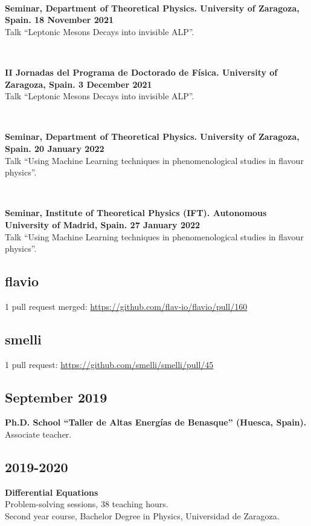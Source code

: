 \documentclass{cvf}
\begin{document}
~

\textbf{Seminar, Department of Theoretical Physics. University of Zaragoza, Spain. 18 November 2021}\\
Talk ``Leptonic Mesons Decays into invisible ALP''.

~

\textbf{II Jornadas del Programa de Doctorado de Física. University of Zaragoza, Spain. 3 December 2021}\\
Talk ``Leptonic Mesons Decays into invisible ALP''.

~

\textbf{Seminar, Department of Theoretical Physics. University of Zaragoza, Spain. 20 January 2022}\\
Talk ``Using Machine Learning techniques in phenomenological studies in flavour physics''.

~

\textbf{Seminar, Institute of Theoretical Physics (IFT). Autonomous University of Madrid, Spain. 27 January 2022}\\
Talk ``Using Machine Learning techniques in phenomenological studies in flavour physics''.


\subsection{flavio}
1 pull request merged: \url{https://github.com/flav-io/flavio/pull/160}

\subsection{smelli}
1 pull request: \url{https://github.com/smelli/smelli/pull/45}


\subsection{September 2019}
\hspace{\parindent}\textbf{Ph.D. School ``Taller de Altas Energías de Benasque'' (Huesca, Spain).}\\
Associate teacher.

\subsection{2019-2020}
\hspace{\parindent}\textbf{Differential Equations}\\
Problem-solving sessions, 38 teaching hours.\\
Second year course, Bachelor Degree in Physics, Universidad de Zaragoza.
\end{document}
